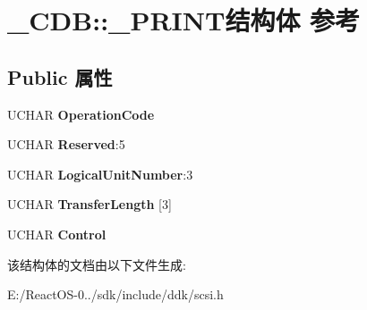 \hypertarget{struct___c_d_b_1_1___p_r_i_n_t}{}\section{\+\_\+\+C\+DB\+:\+:\+\_\+\+P\+R\+I\+N\+T结构体 参考}
\label{struct___c_d_b_1_1___p_r_i_n_t}
\subsection*{Public 属性}
\begin{DoxyCompactItemize}
\item 
\mbox{\label{struct___c_d_b_1_1___p_r_i_n_t_a48df8fc5f18f53ccd697949624ac554b}} 
U\+C\+H\+AR {\bfseries Operation\+Code}
\item 
\mbox{\label{struct___c_d_b_1_1___p_r_i_n_t_a0472883f06abfb6d00b0a30389c2dda0}} 
U\+C\+H\+AR {\bfseries Reserved}\+:5
\item 
\mbox{\label{struct___c_d_b_1_1___p_r_i_n_t_a86c1dd5e69b7bdff6e388f333428923e}} 
U\+C\+H\+AR {\bfseries Logical\+Unit\+Number}\+:3
\item 
\mbox{\label{struct___c_d_b_1_1___p_r_i_n_t_a6f92b4b9aa50e2de503b355037e9ff23}} 
U\+C\+H\+AR {\bfseries Transfer\+Length} \mbox{[}3\mbox{]}
\item 
\mbox{\label{struct___c_d_b_1_1___p_r_i_n_t_af1d3cba1308738ba9c2b341aaf91ef19}} 
U\+C\+H\+AR {\bfseries Control}
\end{DoxyCompactItemize}


该结构体的文档由以下文件生成\+:\begin{DoxyCompactItemize}
\item 
E\+:/\+React\+O\+S-\/0../sdk/include/ddk/scsi.\+h\end{DoxyCompactItemize}
